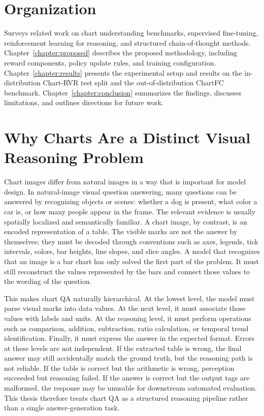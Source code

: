 \documentclass{iutbscthesis}
\begin{document}
\section{Organization}
Surveys related work on chart understanding benchmarks, supervised fine-tuning, reinforcement learning for reasoning, and structured chain-of-thought methods. Chapter~\ref{chapter:proposed} describes the proposed methodology, including reward components, policy update rules, and training configuration. Chapter~\ref{chapter:results} presents the experimental setup and results on the in-distribution Chart-RVR test split and the out-of-distribution ChartFC benchmark. Chapter~\ref{chapter:conclusion} summarizes the findings, discusses limitations, and outlines directions for future work.

\section{Why Charts Are a Distinct Visual Reasoning Problem}

Chart images differ from natural images in a way that is important for model design. In natural-image visual question answering, many questions can be answered by recognizing objects or scenes: whether a dog is present, what color a car is, or how many people appear in the frame. The relevant evidence is usually spatially localized and semantically familiar. A chart image, by contrast, is an encoded representation of a table. The visible marks are not the answer by themselves; they must be decoded through conventions such as axes, legends, tick intervals, colors, bar heights, line slopes, and slice angles. A model that recognizes that an image is a bar chart has only solved the first part of the problem. It must still reconstruct the values represented by the bars and connect those values to the wording of the question.

This makes chart QA naturally hierarchical. At the lowest level, the model must parse visual marks into data values. At the next level, it must associate those values with labels and units. At the reasoning level, it must perform operations such as comparison, addition, subtraction, ratio calculation, or temporal trend identification. Finally, it must express the answer in the expected format. Errors at these levels are not independent. If the extracted table is wrong, the final answer may still accidentally match the ground truth, but the reasoning path is not reliable. If the table is correct but the arithmetic is wrong, perception succeeded but reasoning failed. If the answer is correct but the output tags are malformed, the response may be unusable for downstream automated evaluation. This thesis therefore treats chart QA as a structured reasoning pipeline rather than a single answer-generation task.
\end{document}
